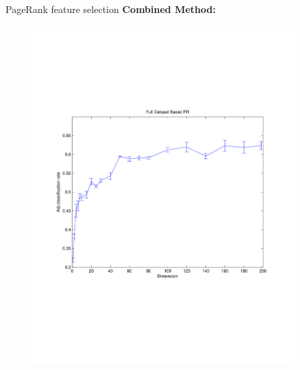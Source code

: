 \documentclass[xcolor=dvipsnames,t]{beamer} %
\begin{document}
\begin{frame}{PageRank feature selection}
\textbf{Combined Method:}
\vspace{-1in}
\begin{figure}
\centering
\includegraphics[width=0.9\textwidth]{figures/fullPR.pdf}
\end{figure}

\end{frame}
\end{document}
